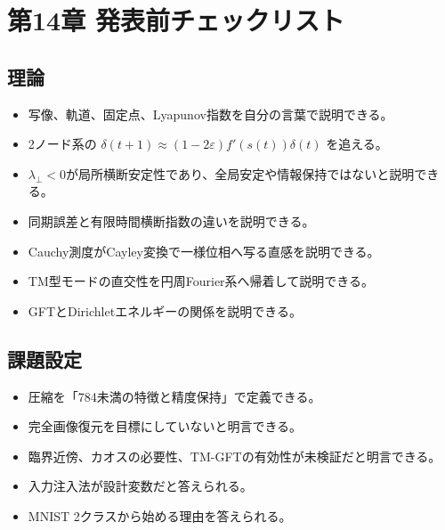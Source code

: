 \documentclass[11pt,a4paper]{ltjsarticle}
\begin{document}
\goodbreak

\section*{\textcolor{researchink}{第14章 発表前チェックリスト}}


\subsection*{\textcolor{researchblue}{理論}}

\begin{itemize}

\item 写像、軌道、固定点、Lyapunov指数を自分の言葉で説明できる。

\item 2ノード系の \(\delta(t+1)\approx(1-2\varepsilon)f'(s(t))\delta(t)\) を追える。

\item \(\lambda_{\perp}<0\)が局所横断安定性であり、全局安定や情報保持ではないと説明できる。

\item 同期誤差と有限時間横断指数の違いを説明できる。

\item Cauchy測度がCayley変換で一様位相へ写る直感を説明できる。

\item TM型モードの直交性を円周Fourier系へ帰着して説明できる。

\item GFTとDirichletエネルギーの関係を説明できる。

\end{itemize}

\subsection*{\textcolor{researchblue}{課題設定}}

\begin{itemize}

\item 圧縮を「784未満の特徴と精度保持」で定義できる。

\item 完全画像復元を目標にしていないと明言できる。

\item 臨界近傍、カオスの必要性、TM-GFTの有効性が未検証だと明言できる。

\item 入力注入法が設計変数だと答えられる。

\item MNIST 2クラスから始める理由を答えられる。

\end{itemize}
\end{document}
